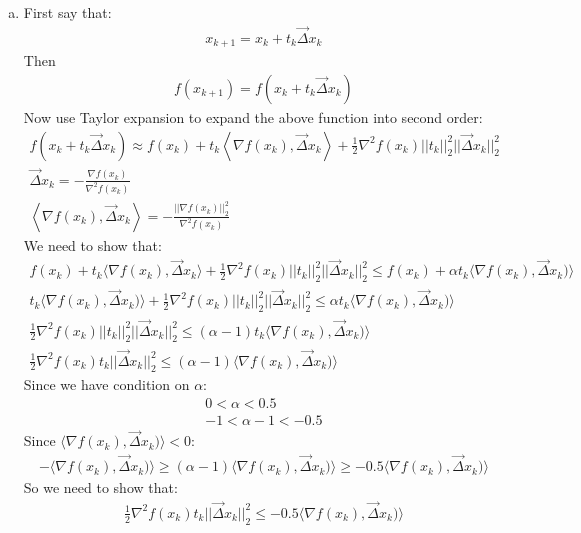 \documentclass[12pt,twoside]{article}
\begin{document}
\begin{enumerate}[a)]
\item 
First say that:
\begin{align}
x_{k+1} = x_k + t_k \vec{\Delta}x_k
\end{align}
Then 
\begin{align}
f(x_{k+1}) = f(x_k + t_k \vec{\Delta}x_k)
\end{align}
Now use Taylor expansion to expand the above function into second order:
\begin{align}
f(x_k + t_k \vec{\Delta}x_k) \approx f(x_k) + t_k\left\langle\nabla f(x_k), \vec{\Delta}x_k\right\rangle + \frac{1}{2}\nabla^2 f(x_k)||t_k||_2^2||\vec{\Delta}x_k||_2^2\\
\vec{\Delta}x_k = - \frac{\nabla f(x_k)}{\nabla^2 f(x_k)}\\
\left\langle\nabla f(x_k), \vec{\Delta}x_k\right\rangle = - \frac{||\nabla f(x_k)||_2^2}{\nabla^2 f(x_k)}
\end{align}
We need to show that:
\begin{align}
f(x_k) + t_k\langle \nabla f(x_k), \vec{\Delta}x_k\rangle + \frac{1}{2}\nabla^2 f(x_k)||t_k||_2^2||\vec{\Delta}x_k||_2^2 \leq f(x_k) + \alpha t_k \langle\nabla f(x_k), \vec{\Delta}x_k)\rangle\\
t_k\langle\nabla f(x_k), \vec{\Delta}x_k)\rangle + \frac{1}{2}\nabla^2 f(x_k)||t_k||_2^2||\vec{\Delta}x_k||_2^2 \leq   \alpha t_k \langle\nabla f(x_k), \vec{\Delta}x_k)\rangle\\
\frac{1}{2}\nabla^2 f(x_k)||t_k||_2^2||\vec{\Delta}x_k||_2^2 \leq   (\alpha - 1) t_k \langle\nabla f(x_k), \vec{\Delta}x_k)\rangle\\
\frac{1}{2}\nabla^2 f(x_k)t_k||\vec{\Delta}x_k||_2^2 \leq   (\alpha - 1)\langle\nabla f(x_k), \vec{\Delta}x_k)\rangle
\end{align}
Since we have condition on $\alpha$:
\begin{align}
0 < \alpha < 0.5\\
-1 < \alpha - 1 < -0.5
\end{align}
Since $\langle\nabla f(x_k), \vec{\Delta}x_k)\rangle < 0$:
\begin{align}
-\langle\nabla f(x_k), \vec{\Delta}x_k)\rangle \geq (\alpha - 1)\langle\nabla f(x_k), \vec{\Delta}x_k)\rangle \geq -0.5\langle\nabla f(x_k), \vec{\Delta}x_k)\rangle
\end{align}
So we need to show that:
\begin{align}
\frac{1}{2}\nabla^2 f(x_k)t_k||\vec{\Delta}x_k||_2^2 \leq   -0.5\langle\nabla f(x_k), \vec{\Delta}x_k)\rangle\\

\end{align}
\end{enumerate}
\end{document}
